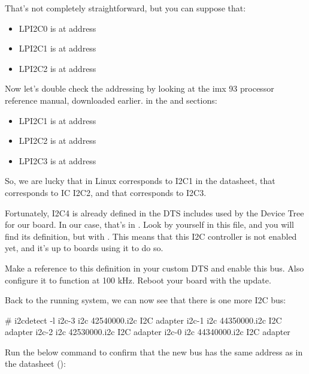 That's not completely straightforward, but you can suppose that:
\begin{itemize}
\item LPI2C0 is at address 
\item LPI2C1 is at address 
\item LPI2C2 is at address 
\end{itemize}

Now let's double check the addressing by looking at the imx 93 processor reference manual, downloaded earlier.
in the  and  sections:

\begin{itemize}
\item LPI2C1 is at address 
\item LPI2C2 is at address 
\item LPI2C3 is at address 
\end{itemize}

So, we are lucky that  in Linux corresponds to I2C1 in the
datasheet, that  corresponds to IC I2C2, and that  corresponds to I2C3.

Fortunately, I2C4 is already defined in the DTS includes
used by the Device Tree for our board. In our case, that's in
. Look by yourself in this
file, and you will find its definition, but with . This means that this I2C controller is not enabled yet,
and it's up to boards using it to do so.

Make a reference to this definition in your custom DTS and enable this
bus. Also configure it to function at 100 kHz. Reboot your board with
the update.

Back to the running system, we can now see that there is one more
I2C bus:

\begin{bashinput}
# i2cdetect -l
i2c-3	i2c       	42540000.i2c                    	I2C adapter
i2c-1	i2c       	44350000.i2c                    	I2C adapter
i2c-2	i2c       	42530000.i2c                    	I2C adapter
i2c-0	i2c       	44340000.i2c                    	I2C adapter

\end{bashinput}

Run the below command to confirm that the new bus has the same address
as in the datasheet ():

